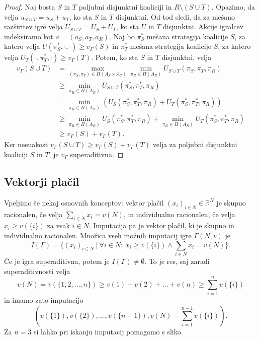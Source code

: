 \documentclass[10pt, a4paper]{article}
\newenvironment{noticeC}{%
  \tcolorbox[%
  notitle,
  empty,
  enhanced,  %
  breakable,
  coltext=black, 
  fontupper=\rmfamily,
  noparskip,
  sharp corners,
  boxrule=-1pt,  %
  frame hidden,
  left=7pt,  %
  right=7pt,
  top=5pt,
  bottom=5pt,
  before skip=2.5ex plus 2pt,
  after skip=2.5ex plus 2pt,
  overlay unbroken and last={%
  },
  ]}
{\endtcolorbox}
\newenvironment{dokaz}%
  {\begin{noticeC}\begin{proof}}%
  {\end{proof}\end{noticeC}}
\newcommand{\R}{\mathbb {R}}
\begin{document}
\begin{dokaz}
  Naj bosta $S$ in $T$ poljubni disjunktni koaliciji in $R \setminus (S \cup T)$.
  Opazimo, da velja $u_{S \cup T} = u_S + u_T$, ko sta $S$ in $T$ disjunktni.
  Od tod sledi, da za mešano razširitev igre velja $U_{S \cup T} = U_S + U_T$,
  ko sta $U$ in $T$ disjunktni.
  Akcije igralcev indeksiramo kot $a = (a_S, a_T, a_R)$.
  Naj bo $\pi_S ^*$ mešana strategija koalicije $S$, za katero velja $U(\pi_S^*, \cdot, \cdot) \geq v_\Gamma (S)$
  in $\pi_T^*$ mešana strategija koalicije $S$, za katero velja $U_T(\cdot, \pi_T^*, \cdot) \geq v_\Gamma (T)$.
  Potem, ko sta $S$ in $T$ disjunktni, velja 
  \begin{align*}
    v_\Gamma (S \cup T) &= \max_{(\pi_S, \pi_T) \in \Pi(A_S \times A_T)} \min_{\pi_R \in \Pi(A_R)} U_{S \cup T} (\pi_S, \pi_T, \pi_R)\\
    &\geq \min_{\pi_R \in \Pi(A_R)} U_{S \cup T} (\pi_S^*, \pi_T^*, \pi_R)\\
    &= \min_{\pi_R \in \Pi(A_R)} \left(U_S (\pi_S^*, \pi_T^*, \pi_R) + U_T (\pi_S^*, \pi_T^*, \pi_R)\right)\\
    &\geq \min_{\pi_R \in \Pi(A_R)} U_S (\pi_S^*, \pi_T^*, \pi_R) + \min_{\pi_R \in \Pi(A_R)} U_T (\pi_S^*, \pi_T^*, \pi_R)\\
    &\geq v_\Gamma(S) + v_\Gamma(T).
  \end{align*}
  Ker neenakost $v_\Gamma(S \cup T) \geq v_\Gamma (S) + v_\Gamma(T)$ velja za poljubni disjunktni koaliciji $S$ in $T$,
  je $v_\Gamma$ superaditivna.
\end{dokaz}

\subsection{Vektorji plačil}

Vpeljimo še nekaj osnovnih konceptov: vektor plačil $(x_i)_{i \in N} \in \R^N$
je skupno racionalen, če velja $\sum_{i \in N} x_i = v(N)$, in individualno racionalen,
če velja $x_i \geq v(\{i\})$ za vsak $i \in N$.
Imputacija pa je vektor plačil, ki je skupno in individualno racionalen.
Množica vseh možnih imputacij igre $\Gamma(N, v)$ je 
$$I(\Gamma) = \{(x_i)_{i \in N}\ |\ \forall i \in N:\ x_i \geq v(\{i\}) \wedge \sum_{i \in N} x_i = v(N)\}.$$
Če je igra superaditivna, potem je $I(\Gamma) \neq \emptyset$.
To je res, saj zaradi superaditivnosti velja 
$$v(N) = v(\{1, 2, \dots, n\}) \geq v(1) + v(2) + \dots + v(n) \geq \sum_{i = 1} ^n v(\{i\})$$
in imamo zato imputacijo
$$\left(v(\{1\}), v(\{2\}),\dots, v(\{n - 1\}), v(N) - \sum_{i = 1} ^{n - 1} v(\{i\}) \right).$$ 
Za $n = 3$ si lahko pri iskanju imputacij pomagamo s sliko.
\end{document}
